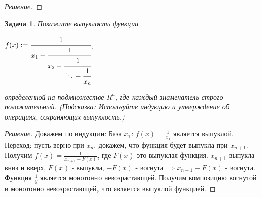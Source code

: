 \documentclass[a4paper]{article}
\newtheorem{problem}{Задача}
\begin{document}
\begin{proof}[Решение]
\end{proof}

\begin{problem}
Покажите выпуклость функции

$f(x) := \cfrac{ 1 }{ x_1 - \cfrac{ 1 }{ x_2 - \cfrac{ 1 }{ \ddots \, - \cfrac{ 1 }{ x_n } } } }$,

определенной на подмножестве $R^n$, где каждый знаменатель строго положительный. (\emph{Подсказка:} Используйте индукцию и утверждение об операциях, сохраняющих выпуклость.)
\end{problem}

\begin{proof}[Решение]
Докажем по индукции: База $x_1$: $f(x) = \frac{1}{x_1}$ является выпуклой. Переход: пусть верно при $x_n$, докажем, что функция будет выпукла при $x_{n + 1}$. Получим $f(x) = \frac{1}{x_{n + 1} - F(x)}$, где $F(x)$ это выпуклая функция. $x_{n + 1}$ выпукла вниз и вверх, $F(x)$ - выпукла, $-F(x)$ - вогнута $\Rightarrow x_{n + 1} - F(x)$ - вогнута. Функция $\frac{1}{y}$ является монотонно невозрастающей. Получим композицию вогнутой и монотонно невозрастающей, что является выпуклой функцией.
\end{proof}
\end{document}
